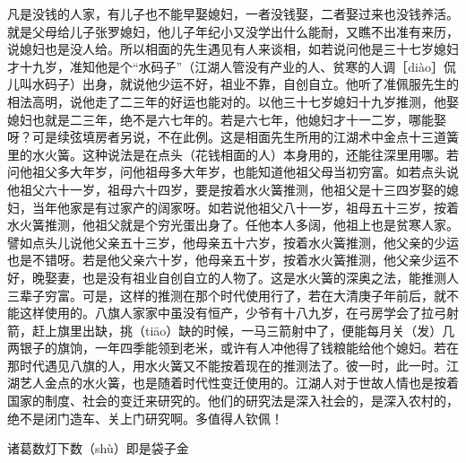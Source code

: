 \documentclass[12pt,UTF8]{ctexbook}
\begin{document}
凡是没钱的人家，有儿子也不能早娶媳妇，一者没钱娶，二者娶过来也没钱养活。就是父母给儿子张罗媳妇，他儿子年纪小又没学出什么能耐，又瞧不出准有来历，说媳妇也是没人给。所以相面的先生遇见有人来谈相，如若说问他是三十七岁媳妇才十九岁，准知他是个“水码子”（江湖人管没有产业的人、贫寒的人调［diào］侃儿叫水码子）出身，就说他少运不好，祖业不靠，自创自立。他听了准佩服先生的相法高明，说他走了二三年的好运也能对的。以他三十七岁媳妇十九岁推测，他娶媳妇也就是二三年，绝不是六七年的。若是六七年，他媳妇才十一二岁，哪能娶呀？可是续弦填房者另说，不在此例。这是相面先生所用的江湖术中金点十三道簧里的水火簧。这种说法是在点头（花钱相面的人）本身用的，还能往深里用哪。若问他祖父多大年岁，问他祖母多大年岁，也能知道他祖父母当初穷富。如若点头说他祖父六十一岁，祖母六十四岁，要是按着水火簧推测，他祖父是十三四岁娶的媳妇，当年他家是有过家产的阔家呀。如若说他祖父八十一岁，祖母五十三岁，按着水火簧推测，他祖父就是个穷光蛋出身了。任他本人多阔，他祖上也是贫寒人家。譬如点头儿说他父亲五十三岁，他母亲五十六岁，按着水火簧推测，他父亲的少运也是不错呀。若是他父亲六十岁，他母亲五十岁，按着水火簧推测，他父亲少运不好，晚娶妻，也是没有祖业自创自立的人物了。这是水火簧的深奥之法，能推测人三辈子穷富。可是，这样的推测在那个时代使用行了，若在大清庚子年前后，就不能这样使用的。八旗人家家中虽没有恒产，少爷有十八九岁，在弓房学会了拉弓射箭，赶上旗里出缺，挑（tiāo）缺的时候，一马三箭射中了，便能每月关（发）几两银子的旗饷，一年四季能领到老米，或许有人冲他得了钱粮能给他个媳妇。若在那时代遇见八旗的人，用水火簧又不能按着现在的推测法了。彼一时，此一时。江湖艺人金点的水火簧，也是随着时代性变迁使用的。江湖人对于世故人情也是按着国家的制度、社会的变迁来研究的。他们的研究法是深入社会的，是深入农村的，绝不是闭门造车、关上门研究啊。多值得人钦佩！





诸葛数灯下数（shù）即是袋子金
\end{document}

